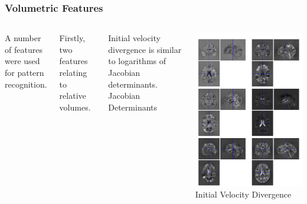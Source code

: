 \begin{frame}
\frametitle{Volumetric Features}
\begin{columns}[c]
A number of features were used for pattern recognition.

Firstly, two features relating to relative volumes.

Initial velocity divergence is similar to logarithms of Jacobian determinants.
Jacobian Determinants

\includegraphics[width=1\textwidth]{jac_ixi}
Initial Velocity Divergence

\end{columns}
\end{frame}
